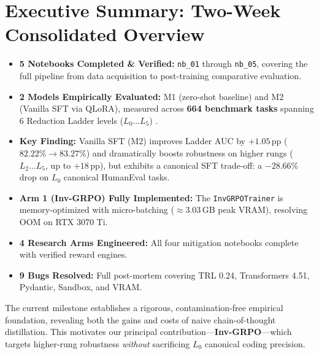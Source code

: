 \documentclass[12pt, a4paper]{article}
\begin{document}
\section{Executive Summary: Two-Week Consolidated Overview}

\begin{researchbox}[title={\faStar\ Two-Week Research Snapshot}]
\begin{itemize}[leftmargin=*]
  \item \textbf{5 Notebooks Completed \& Verified:} \texttt{nb\_01} through \texttt{nb\_05}, covering the full pipeline from data acquisition to post-training comparative evaluation.
  \item \textbf{2 Models Empirically Evaluated:} M1 (zero-shot baseline) and M2 (Vanilla SFT via QLoRA), measured across \textbf{664 benchmark tasks} spanning 6 Reduction Ladder levels ($L_0 \dots L_5$) \cite{evoeval}.
  \item \textbf{Key Finding:} Vanilla SFT (M2) improves Ladder AUC by $+1.05$\,pp ($82.22\% \to 83.27\%$) and dramatically boosts robustness on higher rungs ($L_2 \dots L_5$, up to $+18$\,pp), but exhibits a canonical SFT trade-off: a $-28.66\%$ drop on $L_0$ canonical HumanEval tasks.
  \item \textbf{Arm 1 (Inv-GRPO) Fully Implemented:} The \texttt{InvGRPOTrainer} is memory-optimized with micro-batching ($\approx 3.03$\,GB peak VRAM), resolving OOM on RTX 3070 Ti.
  \item \textbf{4 Research Arms Engineered:} All four mitigation notebooks complete with verified reward engines.
  \item \textbf{9 Bugs Resolved:} Full post-mortem covering TRL 0.24, Transformers 4.51, Pydantic, Sandbox, and VRAM.
\end{itemize}
\end{researchbox}

\vspace{0.4cm}
The current milestone establishes a rigorous, contamination-free empirical foundation, revealing both the gains and costs of naive chain-of-thought distillation. This motivates our principal contribution---\textbf{Inv-GRPO}---which targets higher-rung robustness \emph{without} sacrificing $L_0$ canonical coding precision.

\end{document}
